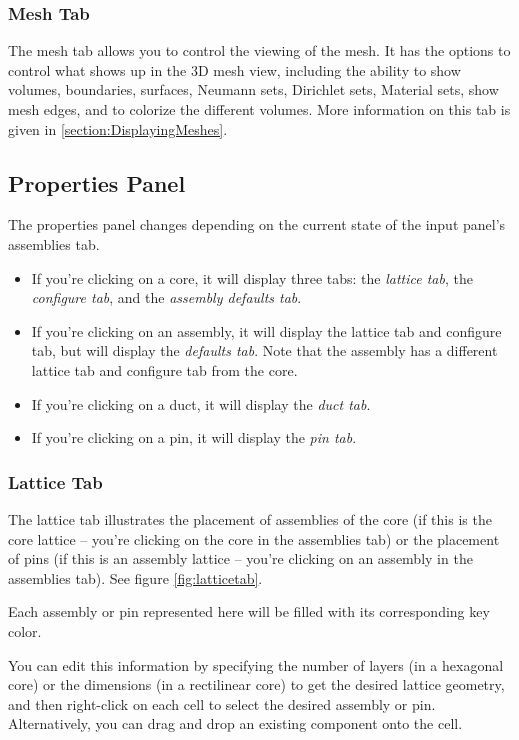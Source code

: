 \subsubsection{Mesh Tab}
The mesh tab allows you to control the viewing of the mesh.  It has the options to control what shows up in the 3D mesh view, including the ability to show volumes, boundaries, surfaces, Neumann sets, Dirichlet sets, Material sets, show mesh edges, and to colorize the different volumes.  More information on this tab is given in \ref{section:DisplayingMeshes}.

\subsection{Properties Panel}
The properties panel changes depending on the current state of the input panel's assemblies tab.

\begin{itemize}
	\item{If you're clicking on a core, it will display three tabs: the \emph{lattice tab}, the \emph{configure tab}, and the \emph{assembly defaults tab}.}
	\item{If you're clicking on an assembly, it will display the lattice tab and configure tab, but will display the \emph{defaults tab}.  Note that the assembly has a different lattice tab and configure tab from the core.}
	\item{If you're clicking on a duct, it will display the \emph{duct tab}.}
	\item{If you're clicking on a pin, it will display the \emph{pin tab}.}
\end{itemize}

\subsubsection{Lattice Tab}
The lattice tab illustrates the placement of assemblies of the core (if this is the core lattice -- you're clicking on the core in the assemblies tab) or the placement of pins (if this is an assembly lattice -- you're clicking on an assembly in the assemblies tab).  See figure \ref{fig:latticetab}.

Each assembly or pin represented here will be filled with its corresponding key color.

You can edit this information by specifying the number of layers (in a hexagonal core) or the dimensions (in a rectilinear core) to get the desired lattice geometry, and then right-click on each cell to select the desired assembly or pin.  Alternatively, you can drag and drop an existing component onto the cell.

